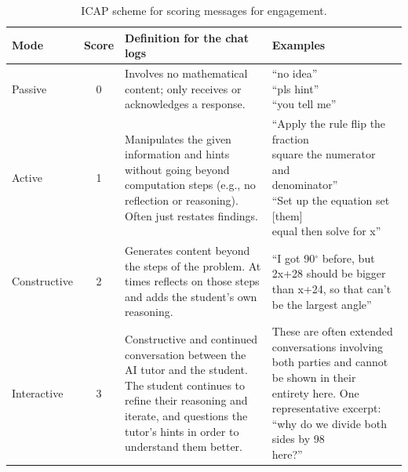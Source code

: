 \documentclass[12pt]{article}
\begin{document}
\begin{table}[htbp]
\centering
\caption{ICAP scheme for scoring messages for engagement.}
\label{tab:icap-rubric}
\small
\begin{tabularx}{\textwidth}{@{}l c X X@{}}
\toprule
\textbf{Mode} & \textbf{Score} & \textbf{Definition for the chat logs} & \textbf{Examples} \\
\midrule
Passive &
0 &
Involves no mathematical content; only receives or acknowledges a response. &
\makecell[t]{ ``no idea'' \\ ``pls hint'' \\ ``you tell me''  } \\
\addlinespace
Active &
1 &
Manipulates the given information and hints without going beyond computation steps (e.g., no reflection or reasoning). Often just restates findings.&
 \makecell[t]{``Apply the rule flip the fraction \\ square the numerator and \\ denominator'' \\ ``Set up the equation set [them] \\ equal then solve for x''} \\
\addlinespace
Constructive &
2 &
Generates content beyond the steps of the problem. At times reflects on those steps and adds the student's own reasoning. &
\makecell[t]{``I got 90$^{\circ}$ before, but 2x+28 should \\ be bigger than x+24, so that \\ can't be the largest angle''}\\ \addlinespace
Interactive &
3 &
Constructive and continued conversation between the AI tutor and the student. The student continues to refine their reasoning and iterate, and questions the tutor's hints in order to understand them better. &
These are often extended conversations involving both parties and cannot be shown in their entirety here. One representative excerpt: \makecell[t]{``why do we divide both sides by 98 \\ here?''} \\
\bottomrule
\end{tabularx}
\end{table}
\end{document}

